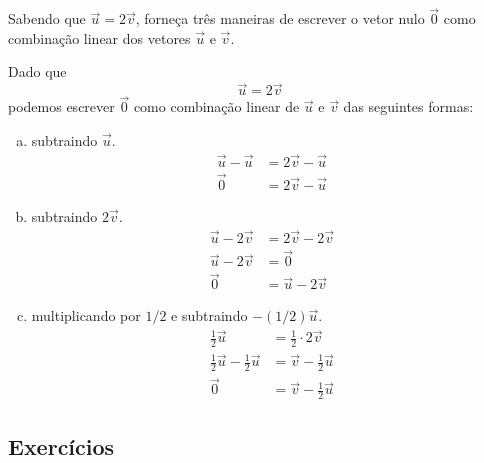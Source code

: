 \begin{exeresol}
  Sabendo que $\vec{u}=2\vec{v}$, forneça três maneiras de escrever o vetor nulo $\vec{0}$ como combinação linear dos vetores $\vec{u}$ e $\vec{v}$.
\end{exeresol}
\begin{resol}
    Dado que
    \begin{equation}
      \vec{u} = 2\vec{v}
    \end{equation}
    podemos escrever $\vec{0}$ como combinação linear de $\vec{u}$ e $\vec{v}$ das seguintes formas:
    \begin{enumerate}[a)]
      \item subtraindo $\vec{u}$.
      \begin{align}
        \vec{u} - \vec{u} &= 2\vec{v} - \vec{u}\\
        \vec{0} &= 2\vec{v}-\vec{u}
      \end{align}
      \item subtraindo $2\vec{v}$.
      \begin{align}
        \vec{u} - 2\vec{v} &= 2\vec{v} - 2\vec{v}\\
        \vec{u} - 2\vec{v} &= \vec{0}\\
        \vec{0} & = \vec{u} - 2\vec{v}
      \end{align}
      \item multiplicando por $1/2$ e subtraindo $-(1/2)\vec{u}$.
      \begin{align}
        \frac{1}{2}\vec{u} &= \frac{1}{2}\cdot 2\vec{v}\\
        \frac{1}{2}\vec{u} - \frac{1}{2}\vec{u} &= \vec{v} - \frac{1}{2}\vec{u}\\
        \vec{0} &= \vec{v}-\frac{1}{2}\vec{u}
      \end{align}
    \end{enumerate}
  \end{resol}

\subsection*{Exercícios}

